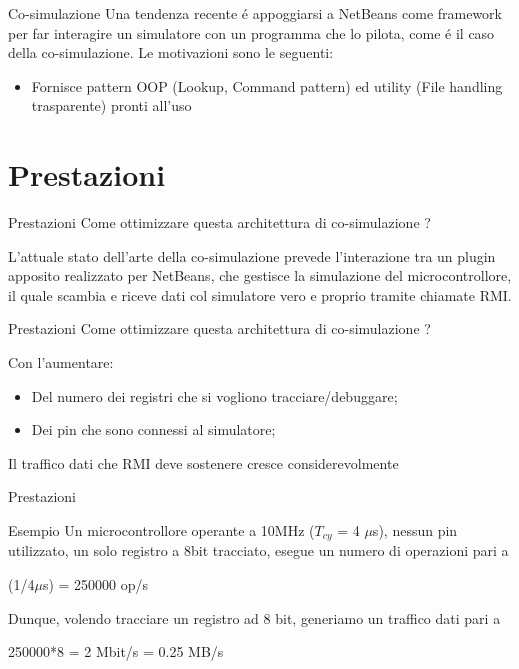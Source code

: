 \documentclass{beamer}
\begin{document}
\begin{frame}{Co-simulazione}
Una tendenza recente \'e appoggiarsi a NetBeans come framework per far interagire un simulatore con un programma che lo pilota, come
\'e il caso della co-simulazione. Le motivazioni sono le seguenti:
\begin{itemize}
  \item  Fornisce pattern OOP (Lookup, Command pattern) ed utility (File handling trasparente) pronti all'uso
\end{itemize}
\end{frame}

\section{Prestazioni}
\begin{frame}{Prestazioni}
Come ottimizzare questa architettura di co-simulazione ?

\bigskip

L'attuale stato dell'arte della co-simulazione prevede l'interazione tra un plugin apposito realizzato per NetBeans, che gestisce la simulazione
del microcontrollore, il quale scambia e riceve dati col simulatore vero e proprio tramite chiamate RMI.
\end{frame}

\begin{frame}{Prestazioni}
Come ottimizzare questa architettura di co-simulazione ?\newline

\bigskip

Con l'aumentare:
\begin{itemize}
  \item Del numero dei registri che si vogliono tracciare/debuggare;
  \item Dei pin che sono connessi al simulatore;
\end{itemize}

\begin{alertblock}{}
Il traffico dati che RMI deve sostenere cresce considerevolmente
\end{alertblock}
\end{frame}

\begin{frame}{Prestazioni}
\begin{exampleblock}{Esempio}
Un microcontrollore operante a 10MHz ($T_{cy}$ = 4 $\mu$s), nessun pin utilizzato, un solo registro a 8bit tracciato,
esegue un numero di operazioni pari a
  \begin{center}
    (1/4$\mu$s) = 250000 op/s
  \end{center}
    Dunque, volendo tracciare un registro ad 8 bit, generiamo un traffico dati pari a
  \begin{center}
250000*8 = 2 Mbit/s = 0.25 MB/s
\end{center}
\end{exampleblock}
\end{frame}
\end{document}
